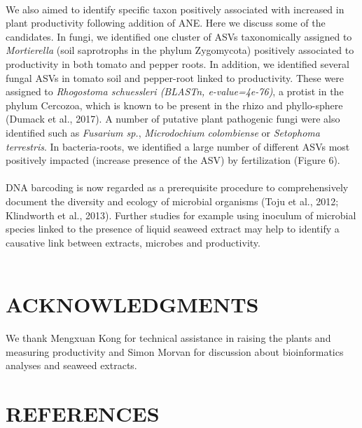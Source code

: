 \documentclass[11pt,]{article}
\begin{document}
\hspace*{0.333em}\\
We also aimed to identify specific taxon positively associated with
increased in plant productivity following addition of ANE. Here we
discuss some of the candidates. In fungi, we identified one cluster of
ASVs taxonomically assigned to \emph{Mortierella} (soil saprotrophs in
the phylum Zygomycota) positively associated to productivity in both
tomato and pepper roots. In addition, we identified several fungal ASVs
in tomato soil and pepper-root linked to productivity. These were
assigned to \emph{Rhogostoma schuessleri (BLASTn, e-value=4e-76)}, a
protist in the phylum Cercozoa, which is known to be present in the
rhizo and phyllo-sphere (Dumack et al., 2017). A number of putative
plant pathogenic fungi were also identified such as \emph{Fusarium sp.},
\emph{Microdochium colombiense} or \emph{Setophoma terrestris}. In
bacteria-roots, we identified a large number of different ASVs most
positively impacted (increase presence of the ASV) by fertilization
(Figure 6).\\
\hspace*{0.333em}\\
DNA barcoding is now regarded as a prerequisite procedure to
comprehensively document the diversity and ecology of microbial
organisms (Toju et al., 2012; Klindworth et al., 2013). Further studies
for example using inoculum of microbial species linked to the presence
of liquid seaweed extract may help to identify a causative link between
extracts, microbes and productivity.\\
\hspace*{0.333em}\\
\hspace*{0.333em}

\section{ACKNOWLEDGMENTS}\label{acknowledgments}

We thank Mengxuan Kong for technical assistance in raising the plants
and measuring productivity and Simon Morvan for discussion about
bioinformatics analyses and seaweed extracts.

\newpage  

\section{REFERENCES}\label{references}
\end{document}
